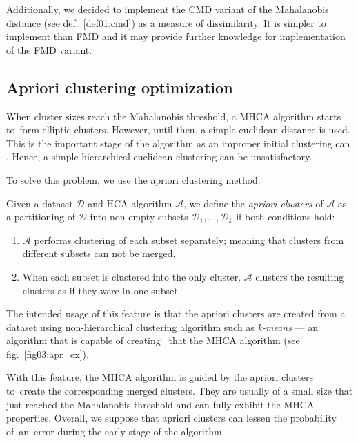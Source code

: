 Additionally, we decided to implement the CMD variant of the Mahalanobis distance (see def.~\ref{def01:cmd}) as a measure of dissimilarity. It is simpler to implement than FMD and it may provide further knowledge for implementation of the FMD variant.

\subsection{Apriori clustering optimization}

When cluster sizes reach the Mahalanobis threshold, a MHCA algorithm starts to~form elliptic clusters. However, until then, a simple euclidean distance is used. This is the important stage of the algorithm as an improper initial clustering can . Hence, a simple hierarchical euclidean clustering can be unsatisfactory.

To solve this problem, we use the apriori clustering method.

\begin{defn}
	Given a dataset $\mathcal{D}$ and HCA algorithm $\mathcal{A}$, we define the \emph{apriori clusters} of $\mathcal{A}$ as a partitioning of  $\mathcal{D}$ into non-empty subsets $\mathcal{D}_1,\dots,\mathcal{D}_k$    if both conditions hold:
	\begin{enumerate}
		\item $\mathcal{A}$ performs clustering of each subset separately; meaning that clusters from different subsets can not be merged.
		\item When each subset is clustered into the only cluster, $\mathcal{A}$ clusters the resulting clusters as if they were in one subset.
	\end{enumerate}
	\label{def03:apriori}
\end{defn}

The intended usage of this feature is that the apriori clusters are created from a dataset using non-hierarchical clustering algorithm such as \emph{k-means} --- an algorithm that is capable of creating \ that the MHCA algorithm (see fig.~\ref{fig03:apr_ex}).

With this feature, the MHCA algorithm is guided by the apriori clusters to~create the corresponding merged clusters. They are usually of a small size that just reached the Mahalanobis threshold and can fully exhibit the MHCA properties. Overall, we suppose that apriori clusters can lessen the probability of~an~error during the early stage of the algorithm.


